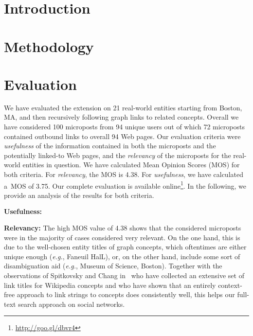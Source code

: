 \documentclass[runningheads,a4paper]{llncs}
\begin{document}
\section{Introduction}

\section{Methodology}

\section{Evaluation}
We have evaluated the extension on 21 real-world entities starting from
Boston, MA, and then recursively following graph links to related concepts.
Overall we have considered 100 microposts from 94 unique users
out of which 72 microposts contained outbound links to overall 94 Web pages.
Our evaluation criteria were \emph{usefulness} of the information
contained in both the microposts and the potentially linked-to Web pages,
and the \emph{relevancy} of the microposts for the real-world entities in question.
We have calculated Mean Opinion Scores (MOS) for both criteria.
For \emph{relevancy}, the MOS is 4.38.
For \emph{usefulness}, we have calculated a~MOS of 3.75.
Our complete evaluation is available online\footnote{\url{http://goo.gl/dbvr4}}.
In the following, we provide an analysis of the results for both criteria.

\noindent \textbf{Usefulness:}


\noindent \textbf{Relevancy:}
The high MOS value of 4.38 shows that the considered microposts
were in the majority of cases considered very relevant.
On the one hand, this is due to the well-chosen entity titles of graph concepts,
which oftentimes are either unique enough (\emph{e.g.}, Faneuil HalL),
or, on the other hand, include some sort of disambiguation aid
(\emph{e.g.}, Museum of Science, Boston).
Together with the observations of Spitkovsky and Chang in~\cite{spitkovsky2012}
who have collected an extensive set of link titles for Wikipedia concepts
and who have shown that an entirely context-free approach
to link strings to concepts does consistently well,
this helps our full-text search approach on social networks.





\end{document}
